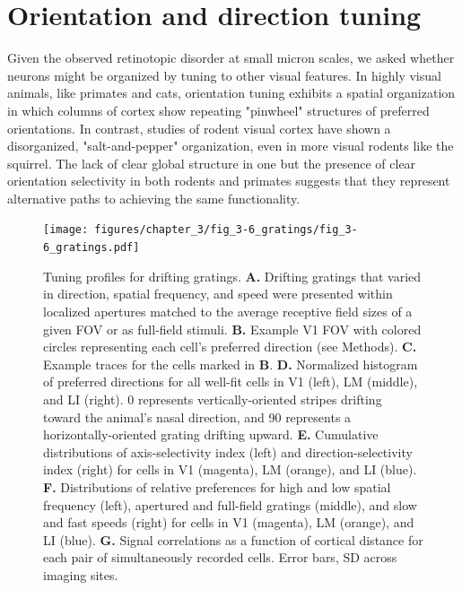  

\section{Orientation and direction tuning}
Given the observed retinotopic disorder at small micron scales, we asked whether neurons might be organized by tuning to other visual features. In highly visual animals, like primates and cats, orientation tuning exhibits a spatial organization in which columns of cortex show repeating "pinwheel" structures of preferred orientations\cite{REFREF}. In contrast, studies of rodent visual cortex have shown a disorganized, "salt-and-pepper" organization\cite{Ohki2005, REFREF}, even in more visual rodents like the squirrel\cite{VanHooser2005FunctionalRodent, REFREF}. The lack of clear global structure in one but the presence of clear orientation selectivity in both rodents and primates suggests that they represent alternative paths to achieving the same functionality.

\begin{figure}[t!]
    \texttt{[image: figures/chapter\_3/fig\_3-6\_gratings/fig\_3-6\_gratings.pdf]}
    \vspace{.1in}
    \caption[Responses to drifting gratings]{Tuning profiles for drifting gratings.
    \textbf{A.} Drifting gratings that varied in direction, spatial frequency, and speed were presented within localized apertures matched to the average receptive field sizes of a given FOV or as full-field stimuli.
    \textbf{B.} Example V1 FOV with colored circles representing each cell's preferred direction (see Methods).
    \textbf{C.} Example traces for the cells marked in \textbf{B}. 
    \textbf{D.} Normalized histogram of preferred directions for all well-fit cells in V1 (left), LM (middle), and LI (right). 0 represents vertically-oriented stripes drifting toward the animal's nasal direction, and 90 represents a horizontally-oriented grating drifting upward.
    \textbf{E.} Cumulative distributions of axis-selectivity index (left) and direction-selectivity index (right) for cells in V1 (magenta), LM (orange), and LI (blue).
    \textbf{F.} Distributions of relative preferences for high and low spatial frequency (left), apertured and full-field gratings (middle), and slow and fast speeds (right) for cells in V1 (magenta), LM (orange), and LI (blue).
    \textbf{G.} Signal correlations as a function of cortical distance for each pair of simultaneously recorded cells. Error bars, SD across imaging sites.  
    \label{fig:gratings}}
\end{figure}


